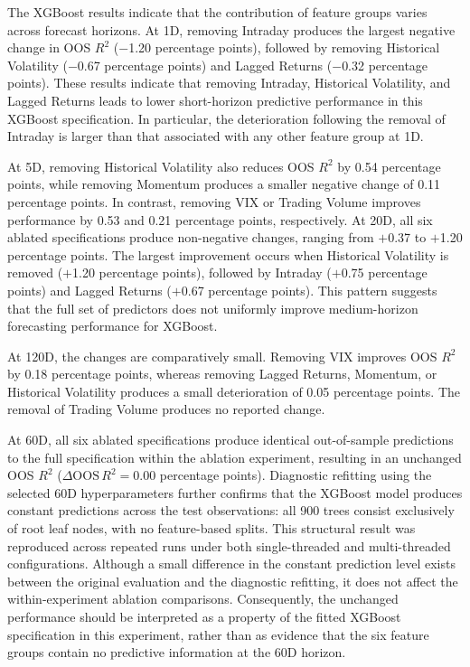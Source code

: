 \documentclass[runningheads,orivec]{llncs}
\begin{document}
The XGBoost results indicate that the contribution of feature groups varies across forecast horizons. At 1D, removing Intraday produces the largest negative change in OOS $R^2$ ($-$1.20 percentage points), followed by removing Historical Volatility ($-$0.67 percentage points) and Lagged Returns ($-$0.32 percentage points). These results indicate that removing Intraday, Historical Volatility, and Lagged Returns leads to lower short-horizon predictive performance in this XGBoost specification. In particular, the deterioration following the removal of Intraday is larger than that associated with any other feature group at 1D.

At 5D, removing Historical Volatility also reduces OOS $R^2$ by 0.54 percentage points, while removing Momentum produces a smaller negative change of 0.11 percentage points. In contrast, removing VIX or Trading Volume improves performance by 0.53 and 0.21 percentage points, respectively. At 20D, all six ablated specifications produce non-negative changes, ranging from $+$0.37 to $+$1.20 percentage points. The largest improvement occurs when Historical Volatility is removed ($+$1.20 percentage points), followed by Intraday ($+$0.75 percentage points) and Lagged Returns ($+$0.67 percentage points). This pattern suggests that the full set of predictors does not uniformly improve medium-horizon forecasting performance for XGBoost.

At 120D, the changes are comparatively small. Removing VIX improves OOS $R^2$ by 0.18 percentage points, whereas removing Lagged Returns, Momentum, or Historical Volatility produces a small deterioration of 0.05 percentage points. The removal of Trading Volume produces no reported change.

At 60D, all six ablated specifications produce identical out-of-sample predictions to the full specification within the ablation experiment, resulting in an unchanged OOS $R^2$ ($\Delta \mathrm{OOS}\,R^2 = 0.00$ percentage points). Diagnostic refitting using the selected 60D hyperparameters further confirms that the XGBoost model produces constant predictions across the test observations: all 900 trees consist exclusively of root leaf nodes, with no feature-based splits. This structural result was reproduced across repeated runs under both single-threaded and multi-threaded configurations. Although a small difference in the constant prediction level exists between the original evaluation and the diagnostic refitting, it does not affect the within-experiment ablation comparisons. Consequently, the unchanged performance should be interpreted as a property of the fitted XGBoost specification in this experiment, rather than as evidence that the six feature groups contain no predictive information at the 60D horizon.
\end{document}
